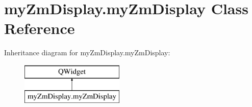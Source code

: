 \hypertarget{classmy_zm_display_1_1my_zm_display}{\section{my\-Zm\-Display.\-my\-Zm\-Display Class Reference}
\label{classmy_zm_display_1_1my_zm_display}
}
Inheritance diagram for my\-Zm\-Display.\-my\-Zm\-Display\-:\begin{figure}[H]
\begin{center}
\leavevmode
\includegraphics[height=2.000000cm]{classmy_zm_display_1_1my_zm_display}
\end{center}
\end{figure}
